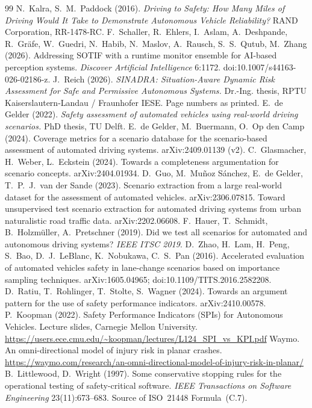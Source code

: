 \documentclass[11pt,a4paper]{article}
\begin{document}
\begin{thebibliography}{99}
 N.~Kalra, S.~M.~Paddock (2016). \emph{Driving to Safety: How Many Miles of Driving Would It Take to Demonstrate Autonomous Vehicle Reliability?} RAND Corporation, RR-1478-RC.
 F.~Schaller, R.~Ehlers, I.~Aslam, A.~Deshpande, R.~Gräfe, W.~Guedri, N.~Habib, N.~Maslov, A.~Rausch, S.~S.~Qutub, M.~Zhang (2026). Addressing SOTIF with a runtime monitor ensemble for AI-based perception systems. \emph{Discover Artificial Intelligence} 6:1172. doi:10.1007/s44163-026-02186-z.
 J.~Reich (2026). \emph{SINADRA: Situation-Aware Dynamic Risk Assessment for Safe and Permissive Autonomous Systems.} Dr.-Ing. thesis, RPTU Kaiserslautern-Landau / Fraunhofer IESE. Page numbers as printed.
 E.~de Gelder (2022). \emph{Safety assessment of automated vehicles using real-world driving scenarios.} PhD thesis, TU Delft.
 E.~de Gelder, M.~Buermann, O.~Op den Camp (2024). Coverage metrics for a scenario database for the scenario-based assessment of automated driving systems. arXiv:2409.01139 (v2).
 C.~Glasmacher, H.~Weber, L.~Eckstein (2024). Towards a completeness argumentation for scenario concepts. arXiv:2404.01934.
 D.~Guo, M.~Muñoz Sánchez, E.~de Gelder, T.~P.~J.~van der Sande (2023). Scenario extraction from a large real-world dataset for the assessment of automated vehicles. arXiv:2306.07815.
 Toward unsupervised test scenario extraction for automated driving systems from urban naturalistic road traffic data. arXiv:2202.06608.
 F.~Hauer, T.~Schmidt, B.~Holzmüller, A.~Pretschner (2019). Did we test all scenarios for automated and autonomous driving systems? \emph{IEEE ITSC 2019}.
 D.~Zhao, H.~Lam, H.~Peng, S.~Bao, D.~J.~LeBlanc, K.~Nobukawa, C.~S.~Pan (2016). Accelerated evaluation of automated vehicles safety in lane-change scenarios based on importance sampling techniques. arXiv:1605.04965; doi:10.1109/TITS.2016.2582208.
 D.~Ratiu, T.~Rohlinger, T.~Stolte, S.~Wagner (2024). Towards an argument pattern for the use of safety performance indicators. arXiv:2410.00578.
 P.~Koopman (2022). Safety Performance Indicators (SPIs) for Autonomous Vehicles. Lecture slides, Carnegie Mellon University. \url{https://users.ece.cmu.edu/~koopman/lectures/L124_SPI_vs_KPI.pdf}
 Waymo. An omni-directional model of injury risk in planar crashes. \url{https://waymo.com/research/an-omni-directional-model-of-injury-risk-in-planar/}
 B.~Littlewood, D.~Wright (1997). Some conservative stopping rules for the operational testing of safety-critical software. \emph{IEEE Transactions on Software Engineering} 23(11):673--683. Source of ISO~21448 Formula~(C.7).

\end{thebibliography}
\end{document}
